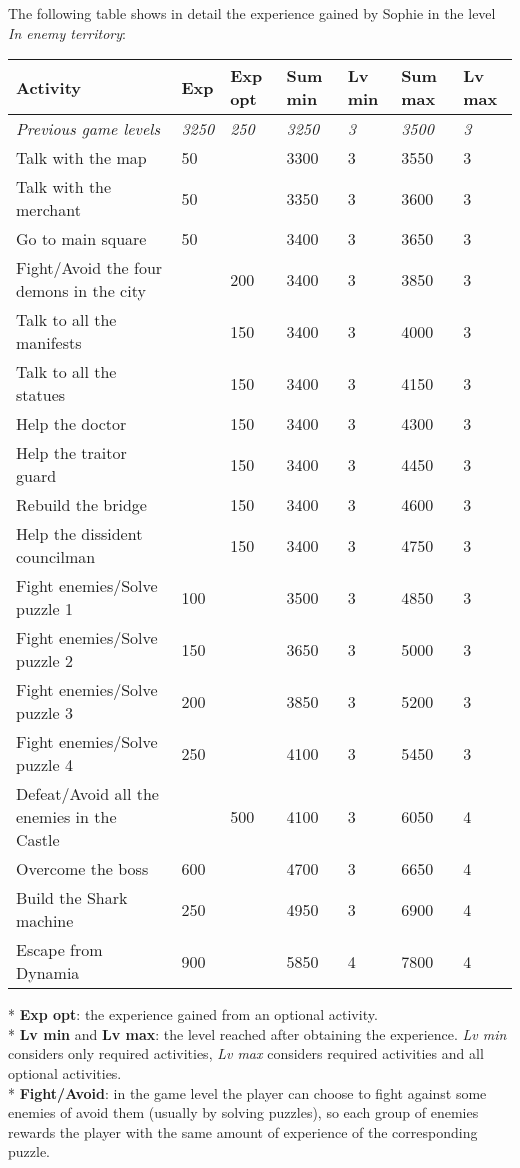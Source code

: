 The following table shows in detail the experience gained by Sophie in the level \textit{In enemy territory}:
\begin{table}[H]
\centering
\begin{tabular}{|p{4cm}|l|l|l|l|l|l|}
\hline
\rowcolor[HTML]{C0C0C0} 
\textbf{Activity} & \textbf{Exp} & \textbf{Exp opt} & \textbf{Sum min} & \textbf{Lv min} & \textbf{Sum max} & \textbf{Lv max} \\ \hline
\textit{Previous game levels} & \textit{3250} & \textit{250} & \textit{3250} & \textit{3} & \textit{3500} & \textit{3} \\ \hline
Talk with the map & 50 &  & 3300 & 3 & 3550 & 3 \\ \hline
Talk with the merchant & 50 &  & 3350 & 3 & 3600 & 3 \\ \hline
Go to main square & 50 &  & 3400 & 3 & 3650 & 3 \\ \hline
Fight/Avoid the four demons in the city &  & 200 & 3400 & 3 & 3850 & 3 \\ \hline
Talk to all the manifests &  & 150 & 3400 & 3 & 4000 & 3 \\ \hline
Talk to all the statues &  & 150 & 3400 & 3 & 4150 & 3 \\ \hline
Help the doctor &  & 150 & 3400 & 3 & 4300 & 3 \\ \hline
Help the traitor guard &  & 150 & 3400 & 3 & 4450 & 3 \\ \hline
Rebuild the bridge &  & 150 & 3400 & 3 & 4600 & 3 \\ \hline
Help the dissident councilman &  & 150 & 3400 & 3 & 4750 & 3 \\ \hline
Fight enemies/Solve puzzle 1 & 100 &  & 3500 & 3 & 4850 & 3 \\ \hline
Fight enemies/Solve puzzle 2 & 150 &  & 3650 & 3 & 5000 & 3 \\ \hline
Fight enemies/Solve puzzle 3 & 200 &  & 3850 & 3 & 5200 & 3 \\ \hline
Fight enemies/Solve puzzle 4 & 250 &  & 4100 & 3 & 5450 & 3 \\ \hline
Defeat/Avoid all the enemies in the Castle &  & 500 & 4100 & 3 & 6050 & 4 \\ \hline
Overcome the boss & 600 &  & 4700 & 3 & 6650 & 4 \\ \hline
Build the Shark machine & 250 &  & 4950 & 3 & 6900 & 4 \\ \hline
Escape from Dynamia & 900 &  & 5850 & 4 & 7800 & 4 \\ \hline
\end{tabular}
\end{table}
* \textbf{Exp opt}: the experience gained from an optional activity. \\
* \textbf{Lv min} and \textbf{Lv max}: the level reached after obtaining the experience. \textit{Lv min} considers only required activities, \textit{Lv max} considers required activities and all optional activities. \\
* \textbf{Fight/Avoid}: in the game level the player can choose to fight against some enemies of avoid them (usually by solving puzzles), so each group of enemies rewards the player with the same amount of experience of the corresponding puzzle.
